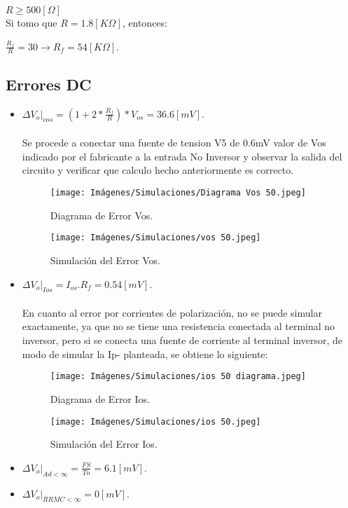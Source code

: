 $R \ge 500[\Omega] $\\

Si tomo que $R=1.8 [K\Omega]$, entonces:

$\frac{R_{f}}{R} = 30 \xrightarrow{} R_{f} = 54 [K\Omega]$.\\

\subsection{Errores DC}

\begin{itemize}
    \item $\Delta V_{o}|_{vos} = (1 + 2*\frac{R_f}{R})*V_{os} = 36.6 [mV].$\\
    \\
    Se procede a conectar una fuente de tension V5 de 0.6mV valor de Vos indicado por el fabricante a la entrada No Inversor y observar la salida del circuito y verificar que calculo hecho anteriormente es correcto.
    \begin{figure}[H]
    \centering
    \begin{minipage}{0.48\textwidth}
        \centering
        \texttt{[image: Imágenes/Simulaciones/Diagrama Vos 50.jpeg]}
        \caption{Diagrama de Error Vos.}
        \label{fig:diagrama_vos}
    \end{minipage}
    \hfill
    \begin{minipage}{0.48\textwidth}
        \centering
        \texttt{[image: Imágenes/Simulaciones/vos 50.jpeg]}
        \caption{Simulación del Error Vos.}
        \label{fig:simu_vos}
    \end{minipage}
\end{figure}
\newpage
    \item $\Delta V_{o}|_{Ios} = I_{os}.R_f = 0.54 [mV].$\\
    \\
    En cuanto al error por corrientes de polarización, no se puede simular exactamente, ya
que no se tiene una resistencia conectada al terminal no inversor, pero si se conecta una
fuente de corriente al terminal inversor, de modo de simular la Ip- planteada, se obtiene lo siguiente:
    \begin{figure}[H]
    \centering
    \begin{minipage}{0.48\textwidth}
        \centering
        \texttt{[image: Imágenes/Simulaciones/ios 50 diagrama.jpeg]}
        \caption{Diagrama de Error Ios.}
        \label{fig:diagrama_vos}
    \end{minipage}
    \hfill
    \begin{minipage}{0.48\textwidth}
        \centering
        \texttt{[image: Imágenes/Simulaciones/ios 50.jpeg]}
        \caption{Simulación del Error Ios.}
        \label{fig:simu_vos}
    \end{minipage}
\end{figure}
    \item $\Delta V_{o}|_{Ad < \infty} = \frac{FS}{To} = 6.1 [mV].$
    \item $\Delta V_{o}|_{RRMC < \infty} = 0 [mV].$
\end{itemize}

